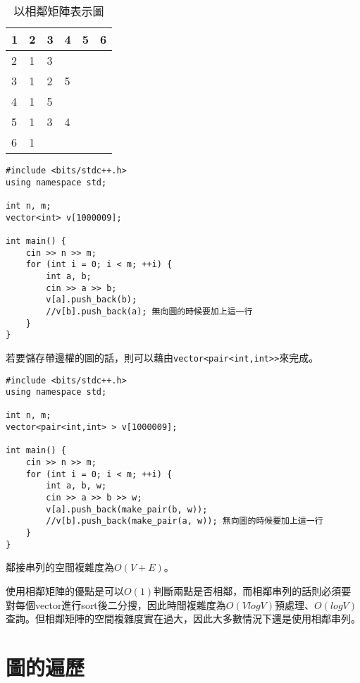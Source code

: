 \begin{table}[ht]
\centering
    \begin{tabular}{| m{1cm} | m{1cm} m{1cm} m{1cm} m{1cm} m{1cm}|} \hline
         1 & 2 & 3 & 4 & 5 & 6\\ \hline
         2 & 1 & 3 &  & &\\ \hline
         3 & 1 & 2 & 5 &  &  \\ \hline
         4 & 1 & 5 &  &  &  \\ \hline
         5 & 1 & 3 & 4 &  &  \\ \hline
         6 & 1 &  &  &  &  \\ \hline
    \end{tabular}
\caption{以相鄰矩陣表示圖}
\end{table}

\begin{lstlisting}
#include <bits/stdc++.h>
using namespace std;

int n, m;
vector<int> v[1000009];

int main() {
	cin >> n >> m;
	for (int i = 0; i < m; ++i) {
		int a, b;
		cin >> a >> b;
		v[a].push_back(b);
		//v[b].push_back(a); 無向圖的時候要加上這一行
	}
}
\end{lstlisting}

\hspace*{\fill}

若要儲存帶邊權的圖的話，則可以藉由\verb|vector<pair<int,int>>|來完成。

\hspace*{\fill}

\begin{lstlisting}
#include <bits/stdc++.h>
using namespace std;

int n, m;
vector<pair<int,int> > v[1000009];

int main() {
	cin >> n >> m;
	for (int i = 0; i < m; ++i) {
		int a, b, w;
		cin >> a >> b >> w;
		v[a].push_back(make_pair(b, w));
		//v[b].push_back(make_pair(a, w)); 無向圖的時候要加上這一行
	}
}
\end{lstlisting}

鄰接串列的空間複雜度為$O(V+E)$。

使用相鄰矩陣的優點是可以$O(1)$判斷兩點是否相鄰，而相鄰串列的話則必須要對每個vector進行sort後二分搜，因此時間複雜度為$O(VlogV)$預處理、$O(logV)$查詢。但相鄰矩陣的空間複雜度實在過大，因此大多數情況下還是使用相鄰串列。

\section{圖的遍歷}

